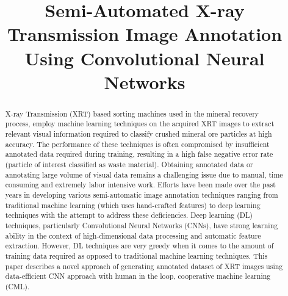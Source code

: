 \documentclass[conference]{IEEEtran}
\begin{document}
\title{Semi-Automated X-ray Transmission Image Annotation Using Convolutional Neural Networks\\
}

\author{
\and
{}
\and
{}

}

\maketitle

\begin{abstract}
X-ray Transmission (XRT) based sorting machines used in the mineral recovery process, employ machine
learning techniques on the acquired XRT images to extract relevant visual information required to classify
crushed mineral ore particles at high accuracy. The performance of these techniques is often compromised
by insufficient annotated data required during training, resulting in a high false negative error rate
(particle of interest classified as waste material). Obtaining annotated data or annotating large
volume of visual data remains a challenging issue due to manual, time consuming and extremely labor
intensive work. Efforts have been made over the past years in developing various semi-automatic image
annotation techniques ranging from traditional machine learning (which uses hand-crafted features) to
deep learning techniques with the attempt to address these deficiencies. Deep learning (DL) techniques,
particularly Convolutional Neural Networks (CNNs), have strong learning ability in
the context of high-dimensional data processing and automatic feature extraction. However, DL techniques
are very greedy when it comes to the amount of training data required as opposed to traditional machine
learning techniques. This paper describes a novel approach of generating
 annotated dataset of XRT images using data-efficient CNN approach with human in the loop, cooperative
machine learning (CML). 

\end{abstract}
\end{document}
